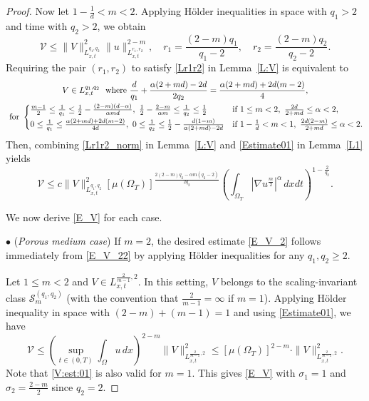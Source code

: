 \documentclass{amsart}
\numberwithin{equation}{section}
\begin{document}
\begin{proof}
Now let $1-\frac{1}{d}< m <2$. Applying H\"{o}lder inequalities in space with $q_1 >2$ and time with $q_2 >2$, we obtain 
\begin{equation*}%
	\mathcal{V} \leq \|V\|_{L_{x,t}^{q_1, q_2}}^{2} \|u\|_{L_{x,t}^{r_1, r_2}}^{2-m},
	\quad  r_1 = \frac{(2-m)q_1}{q_1 - 2}, \quad 	r_2 = \frac{(2-m)q_2}{q_2 - 2}.
	\end{equation*}
Requiring the pair $(r_1, r_2)$ to satisfy \eqref{Lr1r2} in Lemma~\ref{L:V} is equivalent to  
\begin{equation}\label{V_alpha}
\begin{gathered}
V \in L_{x,t}^{q_1,q_2} \ \text{ where } \frac{d}{q_1} + \frac{\alpha (2+md) - 2d}{2q_2} = \frac{\alpha(2+md)+2d(m-2)}{4},	 \\
 \text{ for }
 \begin{cases}
 	\frac{m-1}{2} \leq \frac{1}{q_1} \leq \frac{1}{2}-\frac{(2-m)(d-\alpha)}{\alpha md}, \
 	\frac{1}{2}-\frac{2-m}{\alpha m} \leq \frac{1}{q_2} \leq \frac{1}{2}  &\text{if } 1\leq m < 2, \ \frac{2d}{2+md} \leq \alpha < 2, \vspace{1mm} \\
 	0\leq \frac{1}{q_1} \leq \frac{\alpha(2+md)+2d(m-2)}{4d}, \
 	0 \leq \frac{1}{q_2} \leq \frac{1}{2}-\frac{d(1-m)}{\alpha(2+md)-2d} & \text{if } 1-\frac{1}{d}< m < 1, \ \frac{2d(2-m)}{2+md} \leq \alpha < 2.
 \end{cases}
\end{gathered}\end{equation}
Then, combining \eqref{Lr1r2_norm} in Lemma~\ref{L:V} and \eqref{Estimate01} in Lemma~\ref{L1} yields 
\begin{equation}\label{V:est:02}
\mathcal{V} \leq c\|V\|_{L_{x,t}^{q_1, q_2}}^{2} \left[\mu(\Omega_{T})\right]^{\frac{2(2-m) q_2 - \alpha m (q_2 -2)}{2q_2}} \left(\int_{\Omega_T} \left|\nabla u^{\frac{m}{2}}\right|^{\alpha}\,dxdt\right)^{1-\frac{2}{q_2}}. 
\end{equation}

We now derive \eqref{E_V} for each case. 


$\bullet$ (\emph{Porous medium case}) 
If $m=2$, the desired estimate \eqref{E_V_2} follows immediately from \eqref{E_V_22} by applying H\"{o}lder inequalities for any $q_1, q_2 \geq 2$. 


Let $1\leq m <2$ and $V \in L_{x,t}^{\frac{2}{m-1}, 2}$. In this setting, $V$ belongs to the scaling-invariant class $\mathcal{S}_{m}^{(q_1, q_2)}$ (with the convention that $\frac{2}{m-1}=\infty$ if $m=1$). Applying H\"{o}lder inequality in space with $(2-m)+(m-1)=1$ and using \eqref{Estimate01}, we have
\begin{equation}\label{V:est:01}
\mathcal{V} \leq \left(\sup_{t\in (0,T)} \int_{\Omega} u \,dx\right)^{2-m} \|V\|_{L_{x,t}^{\frac{2}{m-1}, 2}}^{2} \leq [\mu(\Omega_T)]^{2-m} \cdot \|V\|_{L_{x,t}^{\frac{2}{m-1}, 2}}^{2}.
\end{equation}
Note that \eqref{V:est:01} is also valid for $m=1$. This gives \eqref{E_V} with $\sigma_1 = 1$ and $\sigma_{2}=\frac{2-m}{2}$ since $q_2 =2$.



\end{proof}
\end{document}
